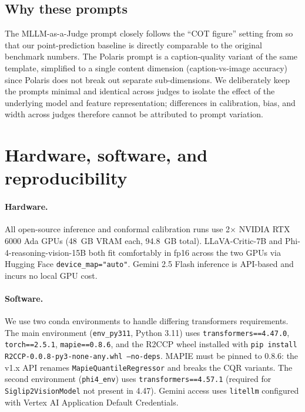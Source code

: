 \documentclass{article}
\begin{document}
\subsection{Why these prompts}

The MLLM-as-a-Judge prompt closely follows the ``COT figure'' setting from \citet{chen2024mllmasajudge} so that our point-prediction baseline is directly comparable to the original benchmark numbers. The Polaris prompt is a caption-quality variant of the same template, simplified to a single content dimension (caption-vs-image accuracy) since Polaris does not break out separate sub-dimensions. We deliberately keep the prompts minimal and identical across judges to isolate the effect of the underlying model and feature representation; differences in calibration, bias, and width across judges therefore cannot be attributed to prompt variation.

\section{Hardware, software, and reproducibility}
\label{app:hardware_software}

\paragraph{Hardware.} All open-source inference and conformal calibration runs use 2$\times$ NVIDIA RTX 6000 Ada GPUs (48~GB VRAM each, 94.8~GB total). LLaVA-Critic-7B and Phi-4-reasoning-vision-15B both fit comfortably in fp16 across the two GPUs via Hugging Face \texttt{device\_map="auto"}. Gemini 2.5 Flash inference is API-based and incurs no local GPU cost.

\paragraph{Software.} We use two conda environments to handle differing transformers requirements. The main environment (\texttt{env\_py311}, Python 3.11) uses \texttt{transformers==4.47.0}, \texttt{torch==2.5.1}, \texttt{mapie==0.8.6}, and the R2CCP wheel installed with \texttt{pip install R2CCP-0.0.8-py3-none-any.whl --no-deps}. MAPIE must be pinned to 0.8.6: the v1.x API renames \texttt{MapieQuantileRegressor} and breaks the CQR variants. The second environment (\texttt{phi4\_env}) uses \texttt{transformers==4.57.1} (required for \texttt{Siglip2VisionModel} not present in 4.47). Gemini access uses \texttt{litellm} configured with Vertex AI Application Default Credentials.
\end{document}
